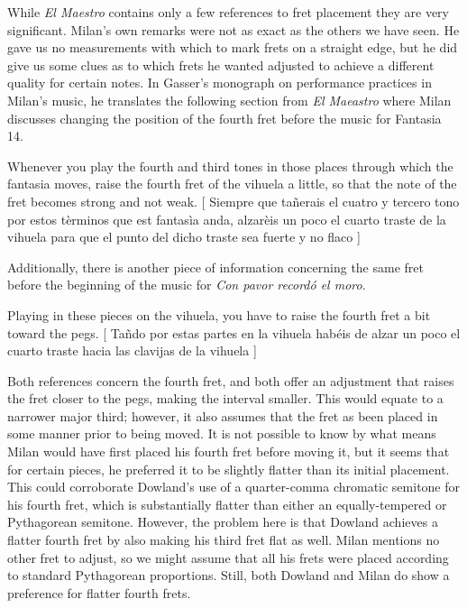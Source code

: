 While \textit{El Maestro} contains only a few references to fret placement they are
very significant.  Milan's own remarks were not as exact as the others we have
seen.  He gave us no measurements with which to mark frets on a straight edge, but he
did give us some clues as to which frets he wanted adjusted to achieve a different
quality for certain notes.  In Gasser's monograph on performance practices in Milan's
music, he translates the following section from \textit{El Maeastro} where Milan
discusses changing the position of the fourth fret before the music for Fantasia 14.
\begin{blocks}
Whenever you play the fourth and third tones in those places through which the fantasia
moves, raise the fourth fret of the vihuela a little, so that the note of the fret
becomes strong and not weak.
[ Siempre que ta\~{n}erais el cuatro y tercero tono por estos t\`{e}rminos que est
fantas\`{i}a anda, alzar\`{e}is un poco el cuarto traste de la vihuela para que el
punto del dicho traste sea fuerte y no flaco ]\autocite[156]{LG:1}
\end{blocks}
Additionally, there is another piece of information concerning the same fret before the
beginning of the music for \textit{Con pavor record\'{o} el moro}.
\begin{blocks}
Playing in these pieces on the vihuela, you have to raise the fourth fret a bit toward
the pegs.
[ Ta\~{n}do por estas partes en la vihuela hab\'{e}is de alzar un poco el
cuarto traste hacia las clavijas de la vihuela ]\autocite[156]{LG:1}
\end{blocks}
Both references concern the fourth fret, and both offer an adjustment that raises the
fret closer to the pegs, making the interval smaller.  This would equate to a narrower
major third; however, it also assumes that the fret as been placed in some manner prior
to being moved.  It is not possible to know by what means Milan would have first placed
his fourth fret before moving it, but it seems that for certain pieces, he preferred it
to be slightly flatter than its initial placement.  This could corroborate Dowland's
use of a quarter-comma chromatic semitone for his fourth fret, which is substantially
flatter than either an equally-tempered or Pythagorean semitone.  However, the problem
here is that Dowland achieves a flatter fourth fret by also making his third fret flat
as well.  Milan mentions no other fret to adjust, so we might assume that all his frets
were placed according to standard Pythagorean proportions.  Still, both Dowland and
Milan do show a preference for flatter fourth frets.

